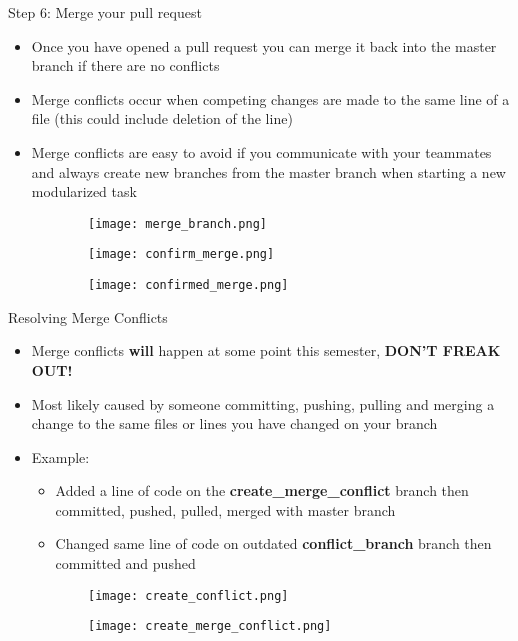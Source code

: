 \documentclass{beamer}
\begin{document}
\begin{frame}{Step 6: Merge your pull request}
\begin{itemize}
    \item Once you have opened a pull request you can merge it back into the master branch if there are no conflicts
    \item Merge conflicts occur when competing changes are made to the same line of a file (this could include deletion of the line)
    \item Merge conflicts are easy to avoid if you communicate with your teammates and always create new branches from the master branch when starting a new modularized task
\end{itemize}
\begin{figure}
\centering
\begin{subfigure}{\textwidth}
  \centering
  \texttt{[image: merge\_branch.png]}
\end{subfigure}%
\begin{subfigure}{\textwidth}
  \centering
  \texttt{[image: confirm\_merge.png]}
\end{subfigure}
\begin{subfigure}{\textwidth}
  \centering
  \texttt{[image: confirmed\_merge.png]}
\end{subfigure}
\end{figure}
\end{frame}

\begin{frame}{Resolving Merge Conflicts}
\begin{itemize}
    \item Merge conflicts \textbf{will} happen at some point this semester, \textbf{DON'T FREAK OUT!}
    \item Most likely caused by someone committing, pushing, pulling and merging a change to the same files or lines you have changed on your branch
    \item Example:
    \begin{itemize}
        \item Added a line of code on the \textbf{create\_merge\_conflict} branch then committed, pushed, pulled, merged with master branch
        \item Changed same line of code on outdated \textbf{conflict\_branch} branch then committed and pushed
    \end{itemize}
\end{itemize}
\begin{figure}
\centering
\begin{subfigure}{\textwidth}
  \centering
  \texttt{[image: create\_conflict.png]}
\end{subfigure}%
\hspace{1cm}
\begin{subfigure}{\textwidth}
  \centering
  \texttt{[image: create\_merge\_conflict.png]}
\end{subfigure}
\end{figure}
\end{frame}
\end{document}
